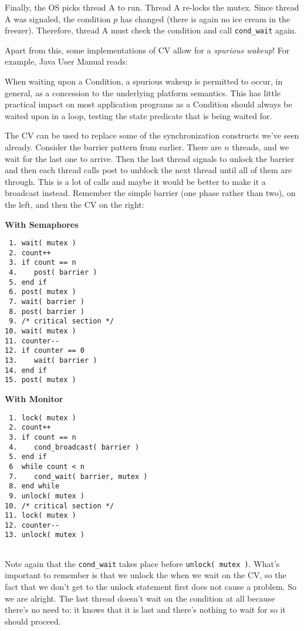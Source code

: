 Finally, the OS picks thread A to run.
Thread A re-locks the mutex.
Since thread A was signaled, the condition $p$ has changed (there is again no ice cream in the freezer).
Therefore, thread A must check the condition and call \texttt{cond\_wait} again.

Apart from this, some implementations of CV allow for a \emph{spurious wakeup}!
For example, Java User Manual reads:
\begin{displayquote}
	When waiting upon a Condition, a spurious wakeup is permitted to occur, in general, as a concession to the underlying platform semantics.
	This has little practical impact on most application programs as a Condition should always be waited upon in a loop, testing the state predicate that is being waited for.
\end{displayquote}

The CV can be used to replace some of the synchronization constructs we've seen already. Consider the barrier pattern from earlier. There are $n$ threads, and we wait for the last one to arrive. Then the last thread signals to unlock the barrier and then each thread calls post to unblock the next thread until all of them are through. This is a lot of calls and maybe it would be better to make it a broadcast instead. Remember the simple barrier (one phase rather than two), on the left, and then the CV on the right:

\newpage

\begin{multicols}{2}
	\textbf{With Semaphores}
	\begin{verbatim}
 1. wait( mutex )
 2. count++
 3. if count == n
 4.    post( barrier )
 5. end if
 6. post( mutex )
 7. wait( barrier )
 8. post( barrier )
 9. /* critical section */
10. wait( mutex )
11. counter--
12. if counter == 0
13.    wait( barrier )
14. end if
15. post( mutex )
	\end{verbatim}
	\columnbreak
	\textbf{With Monitor}\vspace{-2em}
	\begin{verbatim}
 1. lock( mutex )
 2. count++
 3. if count == n
 4.    cond_broadcast( barrier )
 5. end if
 6  while count < n
 7.    cond_wait( barrier, mutex )
 8. end while
 9. unlock( mutex )
10. /* critical section */
11. lock( mutex )
12. counter--
13. unlock( mutex )


	\end{verbatim}
\end{multicols}

Note again that the \texttt{cond\_wait} takes place before \texttt{unlock( mutex )}. What's important to remember is that we unlock the  when we wait on the CV, so the fact that we don't get to the unlock statement first does not cause a problem. So we are alright. The last thread doesn't wait on the condition at all because there's no need to: it knows that it is last and there's nothing to wait for so it should proceed.

